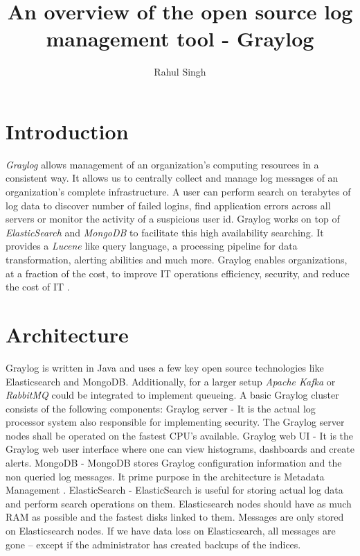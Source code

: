 \documentclass[9pt,twocolumn,twoside]{../../styles/osajnl}
\title{An overview of the open source log management tool - Graylog}
\author[1]{Rahul Singh}
\affil[1]{School of Informatics and Computing, Bloomington, IN 47408, U.S.A.}
\affil[*]{Corresponding authors: rahpsing@iu.edu}
\begin{document}
\maketitle

\section{Introduction}
\emph{Graylog} \cite{www-graylog-org} allows management of an
organization's computing resources in a consistent way. It allows us
to centrally collect and manage log messages of an organization’s
complete infrastructure. A user can perform search on terabytes of log
data to discover number of failed logins, find application errors
across all servers or monitor the activity of a suspicious user
id. Graylog works on top of \emph{ElasticSearch}
\cite{www-elasticsearch-wiki} and \emph{MongoDB}
\cite{www-mongodb-wiki} to facilitate this high availability
searching. It provides a \emph{Lucene} \cite{www-apachelucene-org}
like query language, a processing pipeline for data transformation,
alerting abilities and much more. Graylog enables organizations, at a
fraction of the cost, to improve IT operations efficiency, security,
and reduce the cost of IT \cite{www-graylog-hightech}.


\section{Architecture}

Graylog is written in Java and uses a few key open source technologies
like Elasticsearch and MongoDB. Additionally, for a larger setup
\emph{Apache Kafka} \cite{www-apachekafka-org} or \emph{RabbitMQ}
\cite{www-rabbitmq-com} could be integrated to implement queueing.  A
basic Graylog cluster consists of the following components:
\newline
\newline
Graylog server - It is the actual log processor system also
responsible for implementing security. The Graylog server nodes shall
be operated on the fastest CPU's available.
\newline
\newline
Graylog web UI - It is the Graylog web user interface where one can
view histograms, dashboards and create alerts.
\newline
\newline
MongoDB - MongoDB stores Graylog configuration information and the non
queried log messages. It prime purpose in the architecture is Metadata
Management \cite{www-graylogprocessing-severalnines}.
\newline
\newline
ElasticSearch - ElasticSearch is useful for storing actual log data
and perform search operations on them. Elasticsearch nodes should have
as much RAM as possible and the fastest disks linked to them. Messages
are only stored on Elasticsearch nodes. If we have data loss on
Elasticsearch, all messages are gone – except if the administrator has
created backups of the indices.
\end{document}
